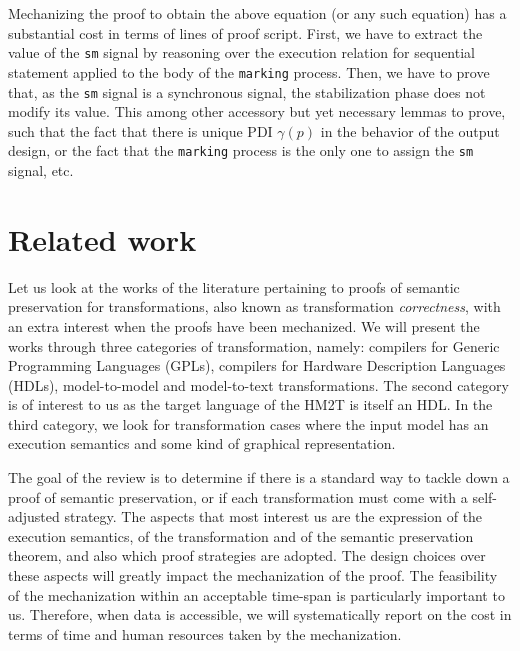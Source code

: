 \documentclass[pdflatex,sn-mathphys]{sn-jnl}%
\theoremstyle{thmstyleone}%
\theoremstyle{thmstyletwo}%
\theoremstyle{thmstylethree}%
\begin{document}
Mechanizing the proof to obtain the above equation (or any such
equation) has a substantial cost in terms of lines of proof
script. First, we have to extract the value of the \texttt{sm} signal
by reasoning over the execution relation for sequential statement
applied to the body of the \texttt{marking} process. Then, we have to
prove that, as the \texttt{sm} signal is a synchronous signal, the
stabilization phase does not modify its value. This among other
accessory but yet necessary lemmas to prove, such that the fact that
there is unique PDI $\gamma(p)$ in the behavior of the output design,
or the fact that the \texttt{marking} process is the only one to
assign the \texttt{sm} signal, etc. %

\section{Related work}
\label{sec:related-work}


Let us look at the works of the literature pertaining to proofs of
semantic preservation for transformations, also known as
transformation \textit{correctness}, with an extra interest when the
proofs have been mechanized. We will present the works through three
categories of transformation, namely: compilers for Generic
Programming Languages (GPLs), compilers for Hardware Description
Languages (HDLs), model-to-model and model-to-text
transformations. The second category is of interest to us as the
target language of the HM2T is itself an HDL. In the third category,
we look for transformation cases where the input model has an
execution semantics and some kind of graphical representation.


The goal of the review is to determine if there is a standard way to
tackle down a proof of semantic preservation, or if each
transformation must come with a self-adjusted strategy. The aspects
that most interest us are the expression of the execution semantics,
of the transformation and of the semantic preservation theorem, and
also which proof strategies are adopted. The design choices over these
aspects will greatly impact the mechanization of the proof. The
feasibility of the mechanization within an acceptable time-span is
particularly important to us. Therefore, when data is accessible, we
will systematically report on the cost in terms of time and human
resources taken by the mechanization.
\end{document}
